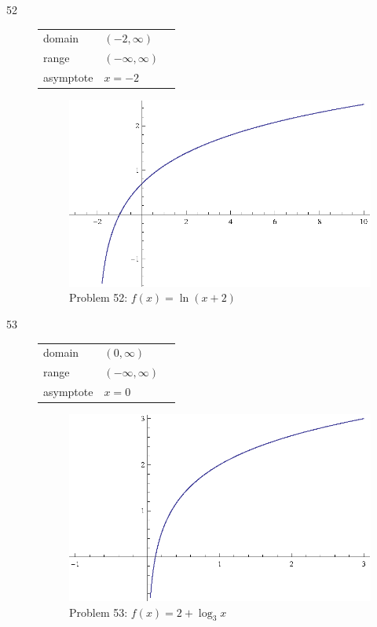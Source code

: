 \documentclass{exam}
\begin{document}
\begin{description}
    \item[52]
      \begin{tabular}[H]{lll}
        \toprule
        domain    & $(-2, \infty)$ \\
        range     & $(-\infty, \infty)$ \\
        asymptote & $x = -2$ \\
        \bottomrule
      \end{tabular}

      \begin{figure}[H]
        \centering
        \includegraphics[scale = 0.9]{problem52.eps}
        \caption{Problem 52: $f(x) = \ln(x + 2)$}
      \end{figure}

    \item[53]
      \begin{tabular}[H]{lll}
        \toprule
        domain    & $(0, \infty)$ \\
        range     & $(-\infty, \infty)$ \\
        asymptote & $x = 0$ \\
        \bottomrule
      \end{tabular}

      \begin{figure}[H]
        \centering
        \includegraphics[scale = 0.9]{problem53.eps}
        \caption{Problem 53: $f(x) = 2 + \log_3 x$}
      \end{figure}


\end{description}
\end{document}
